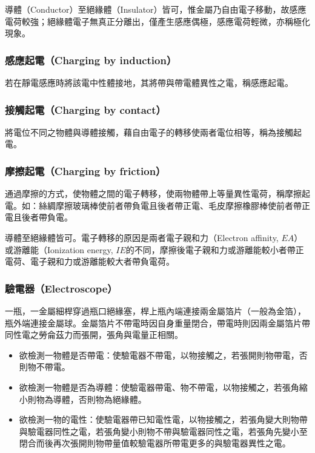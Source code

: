 \documentclass[a4paper,12pt]{report}
\begin{document}
\begin{itemize}
導體（Conductor）至絕緣體（Insulator）皆可，惟金屬乃自由電子移動，故感應電荷較強；絕緣體電子無真正分離出，僅產生感應偶極，感應電荷輕微，亦稱極化現象。
\subsubsection{感應起電（Charging by induction）}
若在靜電感應時將該電中性體接地，其將帶與帶電體異性之電，稱感應起電。
\subsubsection{接觸起電（Charging by contact）}
將電位不同之物體與導體接觸，藉自由電子的轉移使兩者電位相等，稱為接觸起電。
\subsubsection{摩擦起電（Charging by friction）}
通過摩擦的方式，使物體之間的電子轉移，使兩物體帶上等量異性電荷，稱摩擦起電。如：絲綢摩擦玻璃棒使前者帶負電且後者帶正電、毛皮摩擦橡膠棒使前者帶正電且後者帶負電。

導體至絕緣體皆可。電子轉移的原因是兩者電子親和力（Electron affinity, $EA$）或游離能（Ionization energy, $IE$的不同，摩擦後電子親和力或游離能較小者帶正電荷、電子親和力或游離能較大者帶負電荷。
\subsubsection{驗電器（Electroscope）}
一瓶，一金屬細桿穿過瓶口絕緣塞，桿上瓶內端連接兩金屬箔片（一般為金箔），瓶外端連接金屬球。金屬箔片不帶電時因自身重量閉合，帶電時則因兩金屬箔片帶同性電之勞侖茲力而張開，張角與電量正相關。
\begin{itemize}
\item 欲檢測一物體是否帶電：使驗電器不帶電，以物接觸之，若張開則物帶電，否則物不帶電。
\item 欲檢測一物體是否為導體：使驗電器帶電、物不帶電，以物接觸之，若張角縮小則物為導體，否則物為絕緣體。
\item 欲檢測一物的電性：使驗電器帶已知電性電，以物接觸之，若張角變大則物帶與驗電器同性之電，若張角變小則物不帶與驗電器同性之電，若張角先變小至閉合而後再次張開則物帶量值較驗電器所帶電更多的與驗電器異性之電。
\end{itemize}

\end{itemize}
\end{document}
